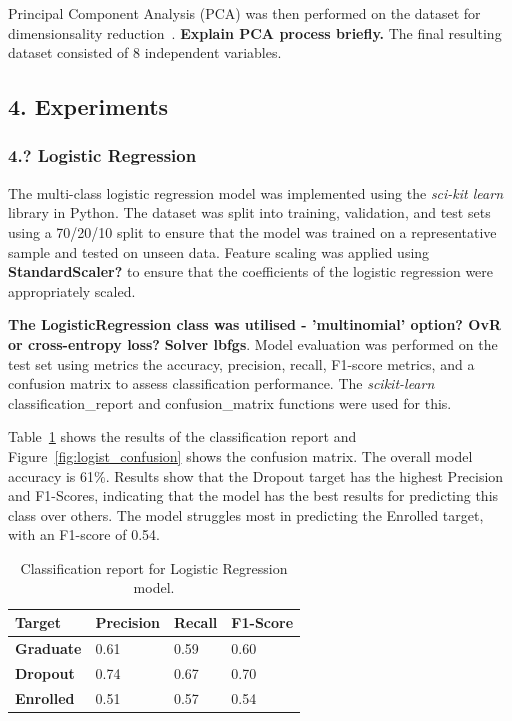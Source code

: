 \documentclass[12pt]{article}
\begin{document}
Principal Component Analysis (PCA) was then performed on the dataset for dimensionsality reduction~\cite{Gewers2021}. \textbf{Explain PCA process briefly.} The final resulting dataset consisted of 8 independent variables.

\newpage
\subsection*{4. Experiments}
\subsubsection*{4.? Logistic Regression}

The multi-class logistic regression model was implemented using the \textit{sci-kit learn} library in Python. The dataset was split into training, validation, and test sets using a 70/20/10 split to ensure that the model was trained on a representative sample and tested on unseen data. Feature scaling was applied using \textbf{StandardScaler?} to ensure that the coefficients of the logistic regression were appropriately scaled.

\textbf{The LogisticRegression class was utilised - 'multinomial' option? OvR or cross-entropy loss?} \textbf{Solver lbfgs}. Model evaluation was performed on the test set using metrics the accuracy, precision, recall, F1-score metrics, and a confusion matrix to assess classification performance. The \textit{scikit-learn} classification\_report and confusion\_matrix functions were used for this. 

Table~\ref{tab:logist_results} shows the results of the classification report and Figure~\ref{fig:logist_confusion} shows the confusion matrix. The overall model accuracy is 61\%. Results show that the Dropout target has the highest Precision and F1-Scores, indicating that the model has the best results for predicting this class over others. The model struggles most in predicting the Enrolled target, with an F1-score of 0.54.
 
\begin{table}[h!]
  \centering
  \begin{tabular}{ | m{2.5cm} || m{2cm} | m{2cm} | m{2cm} | } 
    \hline
    \textbf{Target} & \textbf{Precision} & \textbf{Recall} & \textbf{F1-Score} \\ 
    \hline
    \hline
    \textbf{Graduate} & 0.61 & 0.59 & 0.60 \\ 
    \hline
    \textbf{Dropout} & 0.74 & 0.67 & 0.70 \\ 
    \hline
    \textbf{Enrolled} & 0.51 & 0.57 & 0.54 \\
    \hline
  \end{tabular}
  \caption{Classification report for Logistic Regression model.}
  \label{tab:logist_results}
\end{table}
\end{document}
